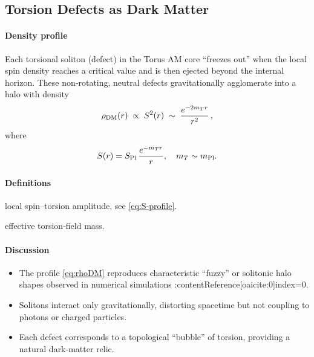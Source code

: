 \documentclass{article}
\newcommand{\Splanck}{S_{\mathrm{Pl}}}
\newcommand{\TorsionProfile}{S^2(r)}
\begin{document}
\subsection{Torsion Defects as Dark Matter}
\label{sec:DM}

\paragraph{Density profile}
Each torsional soliton (defect) in the Torus AM core “freezes out” when the local spin density reaches a critical value and is then ejected beyond the internal horizon.  These non‐rotating, neutral defects gravitationally agglomerate into a halo with density
\begin{equation}\label{eq:rhoDM}
  \rho_{\rm DM}(r)\;\propto\;\TorsionProfile
  \;\sim\;\frac{e^{-2 m_T r}}{r^2}\,,
\end{equation}
where
\[
  S(r)=\Splanck\,\frac{e^{-m_T r}}{r}, 
  \quad
  m_T\sim m_{\rm Pl}.
\]

\paragraph{Definitions}
\begin{description}[leftmargin=2em]
  \item[$S(r)$] local spin–torsion amplitude, see \eqref{eq:S-profile}.
  \item[$m_T$] effective torsion‐field mass.
\end{description}

\paragraph{Discussion}
\begin{itemize}[leftmargin=*]
  \item The profile \eqref{eq:rhoDM} reproduces characteristic “fuzzy” or solitonic halo shapes observed in numerical simulations :contentReference[oaicite:0]{index=0}.
  \item Solitons interact only gravitationally, distorting spacetime but not coupling to photons or charged particles.
  \item Each defect corresponds to a topological “bubble” of torsion, providing a natural dark‐matter relic.
\end{itemize}

\medskip
\begin{center}
\end{center}
\medskip
\end{document}
